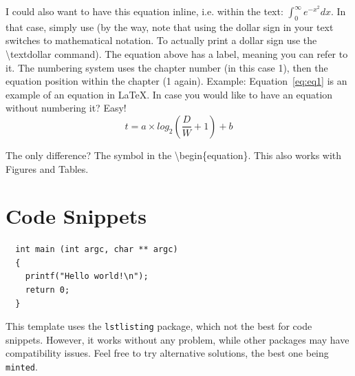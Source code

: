 I could also want to have this equation inline, i.e. within the text: $\int_0^\infty e^{-x^2} dx$.
In that case, simply use \textdollar{} (by the way, note that using the dollar sign in your text switches to mathematical notation. To actually print a dollar sign use the \textbackslash{}textdollar command).
The equation above has a label, meaning you can refer to it. The numbering system uses the chapter number (in this case 1), then the equation position within the chapter (1 again).
Example: Equation~\ref{eq:eq1} is an example of an equation in LaTeX{}.
In case you would like to have an equation without numbering it? Easy!
\begin{equation*}
t = a \times log_{2}(\frac{D}{W} + 1) + b
\end{equation*}

The only difference? The \textasteriskcentered{}  symbol in the \textbackslash{}begin\{equation\textbf{\textasteriskcentered}\}.
This also works with Figures and Tables.

\section{Code Snippets}

\begin{lstlisting}
  int main (int argc, char ** argc)
  {
    printf("Hello world!\n");
    return 0;
  }
\end{lstlisting}

This template uses the \texttt{lstlisting} package, which not the best for code snippets.
However, it works without any problem, while other packages may have compatibility issues.
Feel free to try alternative solutions, the best one being \texttt{minted}.

